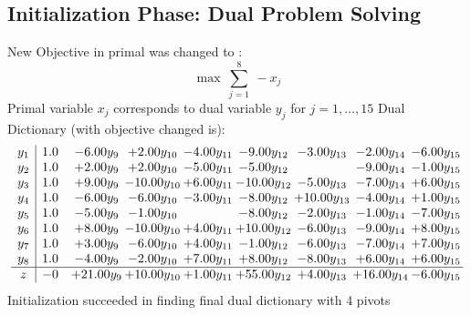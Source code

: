 \documentclass[9pt]{article}
\begin{document}
\subsection{Initialization Phase: Dual Problem Solving}
New Objective in primal was changed to : \[ \max\ \sum_{j=1}^{8}\ - x_j \] 
Primal variable $x_j$ corresponds to dual variable $y_j$ for $j = 1,\ldots,15$
Dual Dictionary (with objective changed is): 
\[\begin{array}{c| c c@{\hskip 2pt} c@{\hskip 2pt} c@{\hskip 2pt} c@{\hskip 2pt} c@{\hskip 2pt} c@{\hskip 2pt} c@{\hskip 2pt} }
 y_{1}   &  1.0 & -6.00 y_{9} & +  2.00 y_{10} & -4.00 y_{11} & -9.00 y_{12} & -3.00 y_{13} & -2.00 y_{14} & -6.00 y_{15}\\
 y_{2}   &  1.0 & +  2.00 y_{9} & +  2.00 y_{10} & -5.00 y_{11} & -5.00 y_{12} &   & -9.00 y_{14} & -1.00 y_{15}\\
 y_{3}   &  1.0 & +  9.00 y_{9} & -10.00 y_{10} & +  6.00 y_{11} & -10.00 y_{12} & -5.00 y_{13} & -7.00 y_{14} & +  6.00 y_{15}\\
 y_{4}   &  1.0 & -6.00 y_{9} & -6.00 y_{10} & -3.00 y_{11} & -8.00 y_{12} & + 10.00 y_{13} & -4.00 y_{14} & +  1.00 y_{15}\\
 y_{5}   &  1.0 & -5.00 y_{9} & -1.00 y_{10} &   & -8.00 y_{12} & -2.00 y_{13} & -1.00 y_{14} & -7.00 y_{15}\\
 y_{6}   &  1.0 & +  8.00 y_{9} & -10.00 y_{10} & +  4.00 y_{11} & + 10.00 y_{12} & -6.00 y_{13} & -9.00 y_{14} & +  8.00 y_{15}\\
 y_{7}   &  1.0 & +  3.00 y_{9} & -6.00 y_{10} & +  4.00 y_{11} & -1.00 y_{12} & -6.00 y_{13} & -7.00 y_{14} & +  7.00 y_{15}\\
 y_{8}   &  1.0 & -4.00 y_{9} & -2.00 y_{10} & +  7.00 y_{11} & +  8.00 y_{12} & -8.00 y_{13} & +  6.00 y_{14} & +  6.00 y_{15}\\
\hline
z    &  -0 & + 21.00 y_{9} & + 10.00 y_{10} & +  1.00 y_{11} & + 55.00 y_{12} & +  4.00 y_{13} & + 16.00 y_{14} & -6.00 y_{15}\\
\end{array}\]
Initialization succeeded in finding final dual dictionary with 4 pivots
\end{document}
